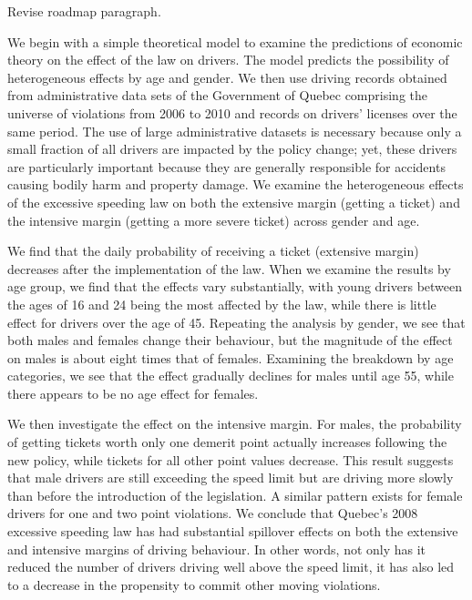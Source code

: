 {\Large Revise roadmap paragraph.}

We begin with a simple theoretical model to examine the predictions of economic theory 
on the effect of the law on drivers. 
% 
The model predicts the possibility of heterogeneous effects by age and gender. 
% 
% 
We then use driving records obtained from administrative data sets 
of the Government of Quebec comprising the universe of violations 
from 2006 to 2010 and records on drivers’ licenses over the same period. 
The use of large administrative datasets is necessary because only a small fraction 
of all drivers are impacted by the policy change; 
yet, these drivers are particularly important because they are 
generally responsible for accidents causing bodily harm and property damage. 
We examine the heterogeneous effects of the excessive speeding law 
on both the extensive margin (getting a ticket) 
and the intensive margin (getting a more severe ticket) across gender and age. 
% 

We find that the daily probability of receiving a ticket (extensive margin) 
decreases after the implementation of the law. 
When we examine the results by age group, we find that the effects vary substantially, 
with young drivers between the ages of 16 and 24 being the most affected by the law, 
while there is little effect for drivers over the age of 45. 
Repeating the analysis by gender, we see that both males and females change their behaviour, 
but the magnitude of the effect on males is about eight times that of females. 
Examining the breakdown by age categories, we see that the effect gradually declines 
for males until age 55, while there appears to be no age effect for females. 

We then investigate the effect on the intensive margin. 
For males, the probability of getting tickets worth only one demerit point 
actually increases following the new policy, while tickets for all other point values decrease. 
This result suggests that male drivers are still exceeding the speed limit 
but are driving more slowly than before the introduction of the legislation. 
A similar pattern exists for female drivers for one and two point violations. 
We conclude that Quebec’s 2008 excessive speeding law has had substantial spillover effects 
on both the extensive and intensive margins of driving behaviour. 
In other words, not only has it reduced the number of drivers driving well above the speed limit, 
it has also led to a decrease in the propensity to commit other moving violations.

